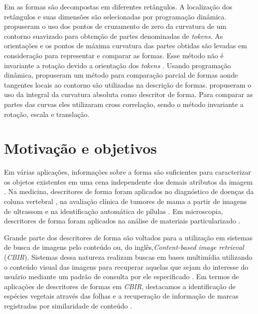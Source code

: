 Em \cite{Kenji:1992} as formas são decompostas em diferentes retângulos. A localização dos retângulos e suas dimensões são selecionadas por programação dinâmica.  propuseram o uso dos pontos de cruzamento de zero da curvatura de um contorno suavizado para obtenção de partes denominadas de \textit{tokens}. As orientações e os pontos de máxima curvatura das partes obtidas são levadas em consideração para representar e comparar as formas. Esse método não é invariante a rotação devido a orientação dos \textit{tokens} \cite{DiRuberto:2009}. Usando programação dinâmica,  propuseram um método para comparação parcial de formas aonde tangentes locais ao contorno são utilizadas na descrição de formas.  propuseram o uso da integral da curvatura absoluta como descritor de forma. Para comparar as partes das curvas eles utilizaram cross correlação, sendo o método invariante a rotação, escala e translação.  

\section{Motivação e objetivos \label{sec:motiv_obj}}
Em várias aplicações, informações sobre a forma são suficientes para caracterizar os objetos existentes em uma cena independente dos demais atributos da imagem \cite{Zhang201661,deSouza2016,Zhao20153203}. Na medicina, descritores de forma foram aplicados no diagnóstico de doenças da coluna vertebral \cite{Lee:2009}, na avaliação clínica de tumores de mama a partir de imagens de ultrassom \cite{Yang:2009} e na identificação automática de pílulas \cite{Ushizima:2015}. Em microscopia, descritores de forma foram aplicados na análise de materiais particularizado \cite{Zhang201661}. 

Grande parte dos descritores de forma \cite{Belongie:2002, 1467513, Nanni20122254, Hu20123348, Latecki:2007, Wang2012134} são voltados para a utilização em sistemas de busca de imagens pelo conteúdo ou, do inglês,\foreignlanguage{english}{\emph{Content-based image retrieval}} (\emph{CBIR}). Sistemas dessa natureza realizam buscas em bases multimídia utilizando o conteúdo visual das imagens para recuperar aquelas que sejam do interesse do usuário mediante um padrão de consulta por ele especificado \cite{Feng:2003}. Em termos de aplicações de descritores de formas em \emph{CBIR}, destacamos a identificação de espécies vegetais através das folhas \cite{deSouza2016,
Fotopoulou:2013,Zhao20153203, Nam2008245, Wang:2000} e a recuperação de informação de marcas registradas por similaridade de conteúdo \cite{MohdAnuar2013105,Qi20102017}.

